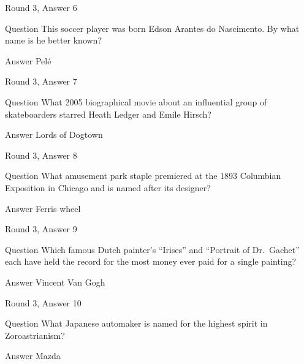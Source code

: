 \documentclass[11pt]{beamer}
\begin{document}
\begin{frame}[t]{Round 3, Answer 6}
\vspace{2em}
\begin{block}{Question}
This soccer player was born Edson Arantes do Nascimento. By what name is he better known\@?
\end{block}
\pause{}
\begin{block}{Answer}
Pelé
\end{block}
\end{frame}
    

\begin{frame}[t]{Round 3, Answer 7}
\vspace{2em}
\begin{block}{Question}
What 2005 biographical movie about an influential group of skateboarders starred Heath Ledger and Emile Hirsch\@?
\end{block}
\pause{}
\begin{block}{Answer}
Lords of Dogtown
\end{block}
\end{frame}
    

\begin{frame}[t]{Round 3, Answer 8}
\vspace{2em}
\begin{block}{Question}
What amusement park staple premiered at the 1893 Columbian Exposition in Chicago and is named after its designer\@?
\end{block}
\pause{}
\begin{block}{Answer}
Ferris wheel
\end{block}
\end{frame}
    

\begin{frame}[t]{Round 3, Answer 9}
\vspace{2em}
\begin{block}{Question}
Which famous Dutch painter's ``Irises'' and ``Portrait of Dr.\ Gachet'' each have held the record for the most money ever paid for a single painting\@?
\end{block}
\pause{}
\begin{block}{Answer}
Vincent Van Gogh
\end{block}
\end{frame}
    

\begin{frame}[t]{Round 3, Answer 10}
\vspace{2em}
\begin{block}{Question}
What Japanese automaker is named for the highest spirit in Zoroastrianism\@?
\end{block}
\pause{}
\begin{block}{Answer}
Mazda
\end{block}
\end{frame}
    
\end{document}
